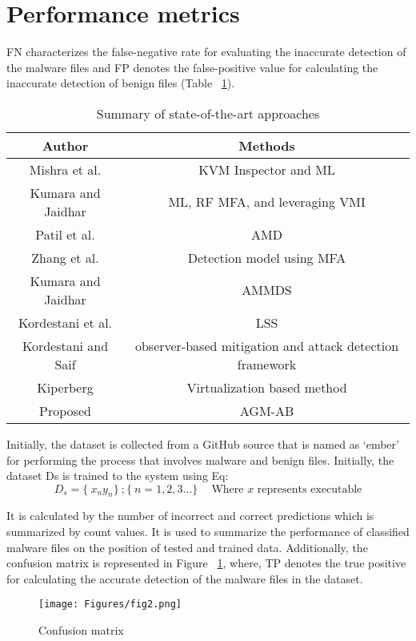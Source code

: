 \documentclass{gji}
\begin{document}
\section {Performance metrics}
FN characterizes the false-negative rate for evaluating the inaccurate detection of the malware files and FP denotes the false-positive value for calculating the inaccurate detection of benign files (Table ~\ref{tab:freq1}).
\begin{table}
  \caption{Summary of state-of-the-art approaches}
  \label{tab:freq1}
  \begin{tabular}{cc}
    Author&Methods\\
    \midrule
        Mishra et al.&KVM Inspector and ML\\
    \midrule
        Kumara and Jaidhar&ML, RF MFA, and leveraging VMI\\
    \midrule
        Patil et al.&AMD\\
    \midrule
        Zhang et al.&Detection model using MFA\\
    \midrule
        Kumara and Jaidhar&AMMDS\\
    \midrule
        Kordestani et al.&LSS\\
    \midrule
        Kordestani and Saif&observer-based mitigation and attack detection framework\\
    \midrule
        Kiperberg&Virtualization based method\\
    \midrule
        Proposed&AGM-AB\\
\end{tabular}
\end{table}
\par Initially, the dataset is collected from a GitHub source that is named as ‘ember’ for performing the process that involves malware and benign files. Initially, the dataset Ds is trained to the system using Eq:
$$
D_s =  \{\ x_n y_n\}\ ; \{\ n = 1,2,3...\}\ \quad \text{Where } x \text{ represents executable} 
$$
\par It is calculated by the number of incorrect and correct predictions which is summarized by count values. It is used to summarize the performance of classified malware files on the position of tested and trained data. Additionally, the confusion matrix is represented in Figure ~\ref{Figure 2:image}, where, TP denotes the true positive for calculating the accurate detection of the malware files in the dataset. 
\begin{figure}
  \centering
  \texttt{[image: Figures/fig2.png]}
  \caption{Confusion matrix}
  \label{Figure 2:image}
\end{figure}
\end{document}
